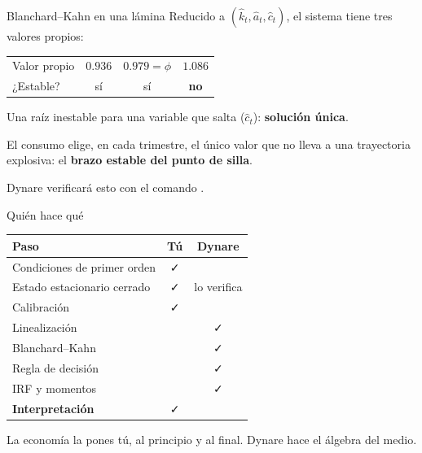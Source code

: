 \begin{frame}[label=bk]{Blanchard--Kahn en una lámina}
  Reducido a $(\hat k_t,\hat a_t,\hat c_t)$, el sistema tiene tres valores propios:
  \vspace{0.25cm}
  \begin{center}
    \renewcommand{\arraystretch}{1.3}
    \begin{tabular}{@{}lccc@{}}
      \toprule
      Valor propio & $0.936$ & $0.979=\phi$ & $1.086$\\
      ¿Estable? & sí & sí & \textbf{no}\\
      \bottomrule
    \end{tabular}
  \end{center}
  \vspace{0.2cm}
  Una raíz inestable para una variable que salta ($\hat c_t$): \textbf{solución única}.\par
  \vspace{0.3cm}
  El consumo elige, en cada trimestre, el único valor que no lleva a una trayectoria
  explosiva: el \textbf{brazo estable del punto de silla}.\par
  \vspace{0.3cm}
  Dynare verificará esto con el comando .
\end{frame}

\begin{frame}[label=reparto]{Quién hace qué}
  \centering
  \renewcommand{\arraystretch}{1.35}
  \begin{tabular}{@{}lcc@{}}
    \toprule
    \textbf{Paso} & \textbf{Tú} & \textbf{Dynare}\\
    \midrule
    Condiciones de primer orden & \faCheck & \\
    Estado estacionario cerrado & \faCheck & lo verifica\\
    Calibración & \faCheck & \\
    Linealización & & \faCheck\\
    Blanchard--Kahn & & \faCheck\\
    Regla de decisión & & \faCheck\\
    IRF y momentos & & \faCheck\\
    \textbf{Interpretación} & \faCheck & \\
    \bottomrule
  \end{tabular}
  \par\vspace{0.4cm}\raggedright
  La economía la pones tú, al principio y al final. Dynare hace el álgebra del medio.
\end{frame}
